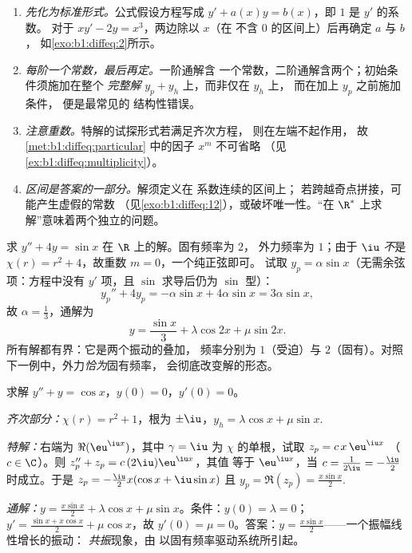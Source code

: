\begin{remark}[常见误区]\label{rem:b1:diffeq:pitfalls}
\begin{enumerate}
  \item \emph{先化为标准形式。}公式假设方程写成
        $y' + a(x)y = b(x)$，即 $1$ 是 $y'$ 的系数。
        对于 $xy' - 2y = x^3$，两边除以 $x$（在
        不含 $0$ 的区间上）后再确定 $a$ 与 $b$，
        如\cref{exo:b1:diffeq:2}所示。
  \item \emph{每阶一个常数，最后再定。}一阶通解含
        一个常数，二阶通解含两个；初始条件须施加在整个
        \emph{完整解} $y_p + y_h$ 上，而非仅在 $y_h$ 上，
        而在加上 $y_p$ 之前施加条件，
        便是最常见的
        结构性错误。
  \item \emph{注意重数。}特解的试探形式若满足齐次方程，
        则在左端不起作用，
        故 \cref{met:b1:diffeq:particular} 中的因子 $x^m$
        不可省略
        （见\cref{ex:b1:diffeq:multiplicity}）。
  \item \emph{区间是答案的一部分。}解须定义在
        系数连续的区间上；
        若跨越奇点拼接，可能产生虚假的常数
        （见\cref{exo:b1:diffeq:12}），或破坏唯一性。“在
        $\R^*$ 上求解”意味着两个独立的问题。
\end{enumerate}
\end{remark}

\begin{example}[非共振受迫]\label{ex:b1:diffeq:offresonance}
求 $y'' + 4y = \sin x$ 在 $\R$ 上的解。固有频率为 $2$，
外力频率为 $1$；由于 $\iu$ \emph{不}是 $\chi(r) = r^2
+ 4$，故重数 $m = 0$，一个纯正弦即可。
试取 $y_p = \alpha\sin x$（无需余弦项：方程中没有
$y'$ 项，且 $\sin$ 求导后仍为 $\sin$ 型）：
\[
y_p'' + 4y_p = -\alpha\sin x + 4\alpha\sin x = 3\alpha\sin x ,
\]
故 $\alpha = \frac13$，通解为
\[
y = \frac{\sin x}3 + \lambda\cos 2x + \mu\sin 2x .
\]
所有解都有界：它是两个振动的叠加，
频率分别为 $1$（受迫）与 $2$（固有）。对照
下一例中，外力\emph{恰为}固有频率，
会彻底改变解的形态。
\end{example}

\begin{example}[受迫振动]\label{ex:b1:diffeq:oscillation}
求解 $y'' + y = \cos x$，$y(0) = 0$，$y'(0) = 0$。

\emph{齐次部分：}$\chi(r) = r^2 + 1$，根为 $\pm\iu$，$y_h =
\lambda\cos x + \mu \sin x$.

\emph{特解：}右端为 $\Re(\eu^{\iu x})$，其中 $\gamma =
\iu$ 为 $\chi$ 的单根，试取 $z_p = c\, x\, \eu^{\iu x}$
（$c \in \C$）。则 $z_p'' + z_p = c\,(2\iu)\eu^{\iu x}$，其值
等于 $\eu^{\iu x}$，当 $c = \frac{1}{2\iu} = -\frac\iu2$ 时成立。于是 $z_p =
-\frac{\iu}{2} x (\cos x + \iu \sin x)$ 且 $y_p = \Re(z_p) =
\frac{x \sin x}{2}$.

\emph{通解：}$y = \frac{x\sin x}{2} + \lambda\cos x +
\mu\sin x$。条件：$y(0) = \lambda = 0$；$y' = \frac{\sin x +
x\cos x}{2} + \mu\cos x$，故 $y'(0) = \mu = 0$。答案：$y =
\frac{x\sin x}{2}$——一个振幅线性增长的振动：
\emph{共振}现象，由
以固有频率驱动系统所引起。
\end{example}

